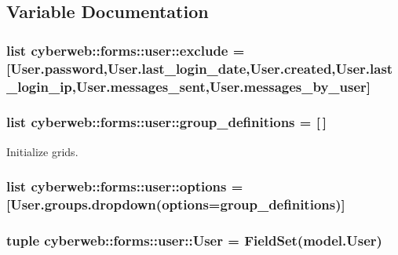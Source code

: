 \subsection{\-Variable \-Documentation}
\hypertarget{namespacecyberweb_1_1forms_1_1user_a5a84ecad1a825ba16b1dc22d2aa63909}{
\subsubsection[{exclude}]{\setlength{\rightskip}{0pt plus 5cm}list {\bf cyberweb\-::forms\-::user\-::exclude} = \mbox{[}\-User.\-password,\-User.\-last\-\_\-login\-\_\-date,\-User.\-created,\-User.\-last\-\_\-login\-\_\-ip,\-User.\-messages\-\_\-sent,\-User.\-messages\-\_\-by\-\_\-user\mbox{]}}}\label{namespacecyberweb_1_1forms_1_1user_a5a84ecad1a825ba16b1dc22d2aa63909}
\hypertarget{namespacecyberweb_1_1forms_1_1user_a370ad090228ed5c8791a370b00f0c19c}{
\subsubsection[{group\-\_\-definitions}]{\setlength{\rightskip}{0pt plus 5cm}list {\bf cyberweb\-::forms\-::user\-::group\-\_\-definitions} = \mbox{[}$\,$\mbox{]}}}\label{namespacecyberweb_1_1forms_1_1user_a370ad090228ed5c8791a370b00f0c19c}


\-Initialize grids. 

\hypertarget{namespacecyberweb_1_1forms_1_1user_ac211fce8aaab8d14e4c7cd5fa472038e}{
\subsubsection[{options}]{\setlength{\rightskip}{0pt plus 5cm}list {\bf cyberweb\-::forms\-::user\-::options} = \mbox{[}\-User.\-groups.\-dropdown({\bf options}={\bf group\-\_\-definitions})\mbox{]}}}\label{namespacecyberweb_1_1forms_1_1user_ac211fce8aaab8d14e4c7cd5fa472038e}
\hypertarget{namespacecyberweb_1_1forms_1_1user_af019239159c43103d39de5007e4585db}{
\subsubsection[{\-User}]{\setlength{\rightskip}{0pt plus 5cm}tuple {\bf cyberweb\-::forms\-::user\-::\-User} = \-Field\-Set({\bf model.\-User})}}\label{namespacecyberweb_1_1forms_1_1user_af019239159c43103d39de5007e4585db}


